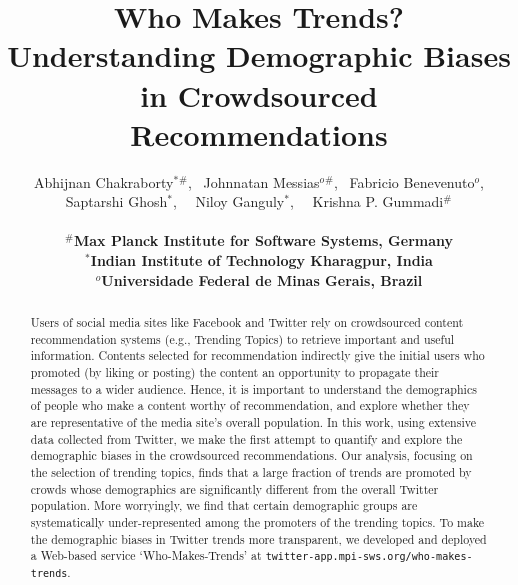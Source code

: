 \documentclass[letterpaper]{article}
\newcommand{\superscript}[1]{\ensuremath{^{#1}}}
\def\iit{\superscript{*}}
\def\mpi{\superscript{\#}}
\def\ufmg{\superscript{o}}
\begin{document}
\title{Who Makes Trends?\\Understanding Demographic Biases in Crowdsourced Recommendations}

\author{
  Abhijnan Chakraborty\iit\mpi,~
  Johnnatan Messias\ufmg\mpi,~
  Fabricio Benevenuto\ufmg,
  \AND
  Saptarshi Ghosh\iit,~~
  Niloy Ganguly\iit,~~
  Krishna P. Gummadi\mpi \\
  ~\\
  {\bf {\mpi}Max Planck Institute for Software Systems, Germany} \\
  {\bf {\iit}Indian Institute of Technology Kharagpur, India} \\
  {\bf {\ufmg}Universidade Federal de Minas Gerais, Brazil} \\
}

\maketitle

\begin{abstract}
\noindent Users of social media sites like Facebook and Twitter rely
on crowdsourced content recommendation systems (e.g., Trending Topics)
to retrieve important and useful information. Contents selected for
recommendation indirectly give the initial users who promoted (by
liking or posting) the content an opportunity to propagate their
messages to a wider audience. Hence, it is important to understand the
demographics of people who make a content worthy of recommendation,
and explore whether they are representative of the media site's
overall population. In this work, using extensive data collected from
Twitter, we make the first attempt to quantify and explore the
demographic biases in the crowdsourced recommendations. Our analysis,
focusing on the selection of trending topics, finds that a large
fraction of trends are promoted by crowds whose demographics are
significantly different from the overall Twitter population. More
worryingly, we find that certain demographic groups are systematically
under-represented among the promoters of the trending topics. To make
the demographic biases in Twitter trends more transparent, we
developed and deployed a Web-based service `Who-Makes-Trends' at 
{\tt twitter-app.mpi-sws.org/who-makes-trends}.
\end{abstract}
\end{document}
